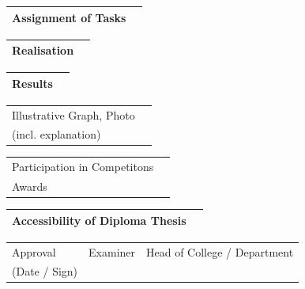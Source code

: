 \begin{tabular}{|p{\feldC}|p{\feldD}|}
 \hline
 Assignment of Tasks & \\
 \hline
\end{tabular}

\begin{tabular}{|p{\feldC}|p{\feldD}|}
 \hline
 Realisation & \\
 \hline
\end{tabular}

\begin{tabular}{|p{\feldC}|p{\feldD}|}
 \hline
 Results & \\
 \hline
\end{tabular}

\begin{tabular}{|p{\feldC}|p{\feldD}|}
 \hline
 Illustrative Graph, Photo & \\
 (incl. explanation) & \\
 \hline
\end{tabular}

\begin{tabular}{|p{\feldC}|p{\feldD}|}
 \hline
 Participation in Competitons & \\
 Awards & \\
 \hline
\end{tabular}

\begin{tabular}{|p{\feldC}|p{\feldD}|}
 \hline
 Accessibility of Diploma Thesis & \\
 \hline
\end{tabular}

\begin{tabular}{|p{\feldC}|p{\feldE}|p{\feldE}|}
 \hline
 Approval & \scriptsize{Examiner} & \scriptsize{Head of College / Department}\\ 
 (Date / Sign)& & \\
 \hline
\end{tabular}
\linespread{1.25} \normalsize
